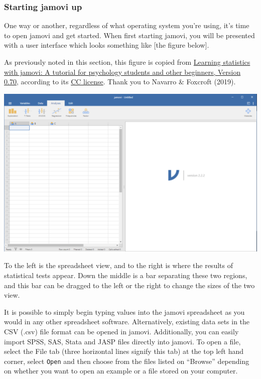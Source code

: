 \documentclass[
]{book}
\begin{document}
\hypertarget{starting-jamovi-up}{%
\subsubsection{Starting jamovi up}\label{starting-jamovi-up}}

One way or another, regardless of what operating system you're using, it's time to open jamovi and get started. When first starting jamovi, you will be presented with a user interface which looks something like {[}the figure below{]}.

As previously noted in this section, this figure is copied from \href{https://www.learnstatswithjamovi.com/}{Learning statistics with jamovi: A tutorial for psychology students and other beginners, Version 0.70}, according to its \href{https://creativecommons.org/licenses/by-sa/4.0/deed.ast}{CC license}. Thank you to Navarro \& Foxcroft (2019).

\includegraphics{img/startingjamovi.png}

To the left is the spreadsheet view, and to the right is where the results of statistical tests appear. Down the middle is a bar separating these two regions, and this bar can be dragged to the left or the right to change the sizes of the two view.

It is possible to simply begin typing values into the jamovi spreadsheet as you would in any other spreadsheet software. Alternatively, existing data sets in the CSV (.csv) file format can be opened in jamovi. Additionally, you can easily import SPSS, SAS, Stata and JASP files directly into jamovi. To open a file, select the File tab (three horizontal lines signify this tab) at the top left hand corner, select \texttt{Open} and then choose from the files listed on ``Browse'' depending on whether you want to open an example or a file stored on your computer.
\end{document}
